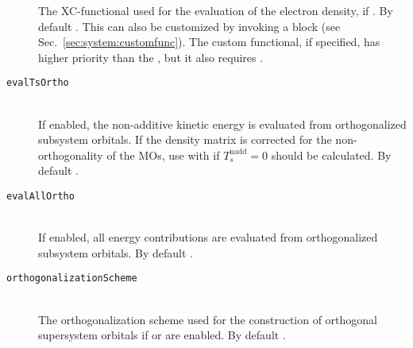 \begin{description}
    The XC-functional used for the evaluation of the electron density, if .
    By default . This can also be customized by invoking a  block (see Sec.~\ref{sec:system:customfunc}). The custom functional, if specified, has higher priority than the , but it also requires .
	\item [\texttt{evalTsOrtho}]\hfill \\
    If enabled, the non-additive kinetic energy is evaluated from orthogonalized subsystem 
    orbitals. If  the density matrix is corrected for
    the non-orthogonality of the MOs, use  with  
    if $T_s^\text{nadd}=0$ should be calculated. By default .
    \item [\texttt{evalAllOrtho}]\hfill \\
    If enabled, all energy contributions are evaluated from orthogonalized subsystem orbitals.
    By default .
    \item [\texttt{orthogonalizationScheme}]\hfill \\ The orthogonalization scheme used
    for the construction of orthogonal supersystem orbitals if  or  are enabled.
    By default .
\end{description}

